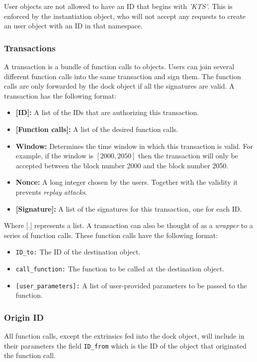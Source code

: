 \documentclass[conference]{IEEEtran}
\begin{document}
User objects are not allowed to have an ID that begins with \textit{'KTS'}. This is enforced by the instantiation object, who will not accept any requests to create an user object with an ID in that namespace.

\subsubsection{Transactions}
A transaction is a bundle of function calls to objects. Users can join several different function calls into the same transaction and sign them. The function calls are only forwarded by the dock object if all the signatures are valid. A transaction has the following format:

\begin{itemize}
	\item \textbf{[ID]:} A list of the IDs that are authorizing this transaction.
	\item \textbf{[Function calls]:} A list of the desired function calls.
	\item \textbf{Window:} Determines the time window in which this transaction is valid. For example, if the window is $[2000, 2050]$ then the transaction will only be accepted between the block number 2000 and the block number 2050.
	\item \textbf{Nonce:} A long integer chosen by the users. Together with the validity it prevents \textit{replay attacks}.
	\item \textbf{[Signature]:} A list of the signatures for this transaction, one for each ID.
\end{itemize}

Where [.] represents a list. A transaction can also be thought of as a \textit{wrapper} to a series of function calls. These function calls have the following format:

\begin{itemize}
	\item \texttt{ID\_to:} The ID of the destination object.
	\item \texttt{call\_function:} The function to be called at the destination object.
	\item \texttt{[user\_parameters]:} A list of user-provided parameters to be passed to the function.
\end{itemize}

\subsubsection{Origin ID}
All function calls, except the extrinsics fed into the dock object, will include in their parameters the field \texttt{ID\_from} which is the ID of the object that originated the function call.
\end{document}

